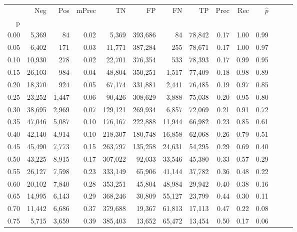 \begin{tabular}{rrrrrrrrrrrrrr}
\toprule
{} &     Neg &    Pos & mPrec &       TN &       FP &      FN &      TP &  Prec &   Rec & $\hat{p}$ \\
p    &         &        &       &          &          &         &         &       &       &           \\
\midrule
0.00 &   5,369 &     84 &  0.02 &    5,369 &  393,686 &      84 &  78,842 &  0.17 &  1.00 &      0.99 \\
0.05 &   6,402 &    171 &  0.03 &   11,771 &  387,284 &     255 &  78,671 &  0.17 &  1.00 &      0.97 \\
0.10 &  10,930 &    278 &  0.02 &   22,701 &  376,354 &     533 &  78,393 &  0.17 &  0.99 &      0.95 \\
0.15 &  26,103 &    984 &  0.04 &   48,804 &  350,251 &   1,517 &  77,409 &  0.18 &  0.98 &      0.89 \\
0.20 &  18,370 &    924 &  0.05 &   67,174 &  331,881 &   2,441 &  76,485 &  0.19 &  0.97 &      0.85 \\
0.25 &  23,252 &  1,447 &  0.06 &   90,426 &  308,629 &   3,888 &  75,038 &  0.20 &  0.95 &      0.80 \\
0.30 &  38,695 &  2,969 &  0.07 &  129,121 &  269,934 &   6,857 &  72,069 &  0.21 &  0.91 &      0.72 \\
0.35 &  47,046 &  5,087 &  0.10 &  176,167 &  222,888 &  11,944 &  66,982 &  0.23 &  0.85 &      0.61 \\
0.40 &  42,140 &  4,914 &  0.10 &  218,307 &  180,748 &  16,858 &  62,068 &  0.26 &  0.79 &      0.51 \\
0.45 &  45,490 &  7,773 &  0.15 &  263,797 &  135,258 &  24,631 &  54,295 &  0.29 &  0.69 &      0.40 \\
0.50 &  43,225 &  8,915 &  0.17 &  307,022 &   92,033 &  33,546 &  45,380 &  0.33 &  0.57 &      0.29 \\
0.55 &  26,127 &  7,598 &  0.23 &  333,149 &   65,906 &  41,144 &  37,782 &  0.36 &  0.48 &      0.22 \\
0.60 &  20,102 &  7,840 &  0.28 &  353,251 &   45,804 &  48,984 &  29,942 &  0.40 &  0.38 &      0.16 \\
0.65 &  14,995 &  6,143 &  0.29 &  368,246 &   30,809 &  55,127 &  23,799 &  0.44 &  0.30 &      0.11 \\
0.70 &  11,442 &  6,686 &  0.37 &  379,688 &   19,367 &  61,813 &  17,113 &  0.47 &  0.22 &      0.08 \\
0.75 &   5,715 &  3,659 &  0.39 &  385,403 &   13,652 &  65,472 &  13,454 &  0.50 &  0.17 &      0.06 \\

\end{tabular}
